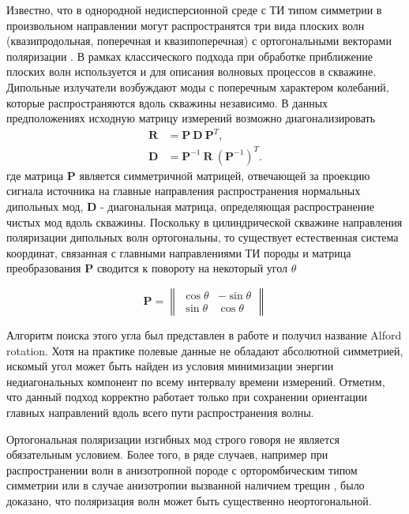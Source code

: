 \documentclass[a4paper,11pt]{article}
\begin{document}
Известно, что в однородной недисперсионной среде с ТИ типом симметрии в произвольном направлении могут распространятся три вида плоских волн (квазипродольная, поперечная и квазипоперечная) с ортогональными векторами поляризации \cite{Musgrave1970}. В рамках классического подхода при обработке приближение плоских волн используется и для описания волновых процессов в скважине. Дипольные излучатели возбуждают моды с поперечным характером колебаний, которые распространяются вдоль скважины независимо. В данных предположениях исходную матрицу измерений возможно диагонализировать \cite{Dellinger1998}
\begin{equation}
\begin{split}
	\mathbf{R} &= \mathbf{P} \ \mathbf{D} \ \mathbf{P}^T, \label{eq:alford_symmetric} \\ 
	\mathbf{D} &= \mathbf{P}^{-1} \ \mathbf{R} \ (\mathbf{P}^{-1})^{T}.
\end{split}
\end{equation}
где матрица $\mathbf{P}$ является симметричной матрицей, отвечающей за проекцию сигнала источника на главные направления распространения нормальных дипольных мод, $\mathbf{D}$ - диагональная матрица, определяющая распространение чистых мод вдоль скважины. Поскольку в цилиндрической скважине направления поляризации дипольных волн ортогональны, то существует естественная система координат, связанная с главными направлениями ТИ породы и матрица преобразования $\mathbf{P}$ сводится к повороту на некоторый угол $\theta$

\begin{equation*}
	\mathbf{P} = \left\|
	\begin{array}{cc}
	\cos \theta &-\sin \theta \\ 
	\sin \theta & \cos \theta
	\end{array} 
	\right\| 
\end{equation*}

Алгоритм поиска этого угла был представлен в работе \cite{Alford1986} и получил название Alford rotation. Хотя на практике полевые данные не обладают абсолютной симметрией, искомый угол может быть найден из условия минимизации энергии недиагональных компонент по всему интервалу времени измерений. Отметим, что данный подход корректно работает только при сохранении ориентации главных направлений вдоль всего пути распространения волны.

Ортогональная поляризации изгибных мод строго говоря не является обязательным условием. Более того, в ряде случаев, например при распространении волн в анизотропной породе с орторомбическим типом симметрии \cite{Dellinger2001} или в случае анизотропии вызванной наличием трещин \cite{Nolte1996}, было доказано, что поляризация волн может быть существенно неортогональной. 
\end{document}
